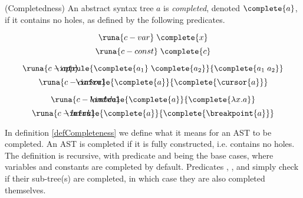 %
\theoremstyle{definition}
\begin{definition}{(Completedness)}
An abstract syntax tree $a$ is \textit{completed}, denoted $\complete{a}$, if it contains no holes, as defined by the following predicates.
\vspace*{-0.8cm}
\begin{adjmulticols}{2}{-25pt}{0.7in}
    \begin{equation*}
       \runa{c-var}\; \complete{x} \label{completenessVar}
    \end{equation*}\break
    \begin{equation*}
        \runa{c-const}\; \complete{c} \label{completenessCons}
    \end{equation*}
\end{adjmulticols}
\vspace*{-1.2cm}
\begin{adjmulticols}{2}{17pt}{0.25in}
    \begin{equation*}
        \runa{c-app}\;\hspace{-1.1cm} \infrule{\complete{a_1}\; \complete{a_2}}{\complete{a_1\; a_2}} \label{completenessApp}
    \end{equation*}\break
    \begin{equation*}
        \runa{c-cursor}\;\hspace{-1.4cm}  \infrule{\complete{a}}{\complete{\cursor{a}}}
    \end{equation*}
\end{adjmulticols}
\vspace*{-1.5cm}
\begin{adjmulticols}{2}{-5pt}{0.11in}
  \begin{equation*}
        \runa{c-lambda}\;\hspace{-1.4cm} \infrule{\complete{a}}{\complete{\lambda x.a}} \label{completenessLamb}
    \end{equation*}\break
    \begin{equation*}
        \runa{c-break}\;\hspace{-1.4cm} \infrule{\complete{a}}{\complete{\breakpoint{a}}} \label{completenessBreak}
    \end{equation*}
\end{adjmulticols}
\label{defCompleteness}
\end{definition}

In definition \ref{defCompleteness} we define what it means for an AST to be completed. An AST is completed if it is fully constructed, i.e. contains no holes. The definition is recursive, with predicate  and  being the base cases, where variables and constants are completed by default. Predicates , ,  and  simply check if their sub-tree(s) are completed, in which case they are also completed themselves.

